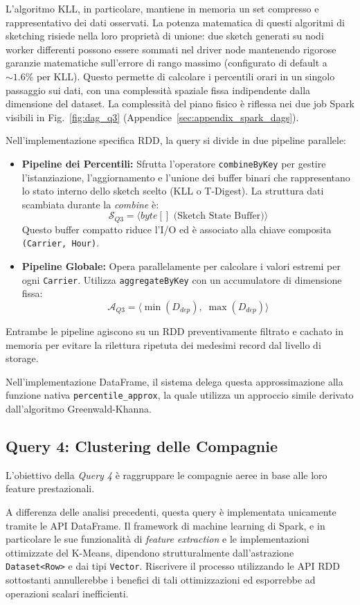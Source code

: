 \documentclass[conference]{IEEEtran}
\begin{document}
L'algoritmo KLL, in particolare, mantiene in memoria un set compresso e rappresentativo dei dati osservati.
La potenza matematica di questi algoritmi di sketching risiede nella loro proprietà di unione: due sketch generati su nodi worker differenti possono essere sommati nel driver node mantenendo rigorose garanzie matematiche sull'errore di rango massimo (configurato di default a $\sim 1.6\%$ per KLL).
Questo permette di calcolare i percentili orari in un singolo passaggio sui dati, con una complessità spaziale fissa indipendente dalla dimensione del dataset.
La complessità del piano fisico è riflessa nei due job Spark visibili in Fig.~\ref{fig:dag_q3} (Appendice~\ref{sec:appendix_spark_dags}).

Nell'implementazione specifica RDD, la query si divide in due pipeline parallele:
\begin{itemize}
    \item \textbf{Pipeline dei Percentili:} Sfrutta l'operatore \texttt{combineByKey} per gestire l'istanziazione, l'aggiornamento e l'unione dei buffer binari che rappresentano lo stato interno dello sketch scelto (KLL o T-Digest). La struttura dati scambiata durante la \textit{combine} è:
    \[
    \mathcal{S}_{Q3} = \langle byte[] \text{ (Sketch State Buffer)} \rangle
    \]
    Questo buffer compatto riduce l'I/O ed è associato alla chiave composita \texttt{(Carrier, Hour)}.
    \item \textbf{Pipeline Globale:} Opera parallelamente per calcolare i valori estremi per ogni \texttt{Carrier}. Utilizza \texttt{aggregateByKey} con un accumulatore di dimensione fissa:
    \[
    \mathcal{A}_{Q3} = \langle \min(D_{dep}),\; \max(D_{dep}) \rangle
    \]
\end{itemize}
Entrambe le pipeline agiscono su un RDD preventivamente filtrato e cachato in memoria per evitare la rilettura ripetuta dei medesimi record dal livello di storage.

Nell'implementazione DataFrame, il sistema delega questa approssimazione alla funzione nativa \texttt{percentile\_approx}, la quale utilizza un approccio simile derivato dall'algoritmo Greenwald-Khanna.

\subsection{Query 4: Clustering delle Compagnie}
L'obiettivo della \textit{Query 4} è raggruppare le compagnie aeree in base alle loro feature prestazionali.

A differenza delle analisi precedenti, questa query è implementata unicamente tramite le API DataFrame.
Il framework di machine learning di Spark, e in particolare le sue funzionalità di \textit{feature extraction} e le implementazioni ottimizzate del K-Means, dipendono strutturalmente dall'astrazione \texttt{Dataset<Row>} e dai tipi \texttt{Vector}.
Riscrivere il processo utilizzando le API RDD sottostanti annullerebbe i benefici di tali ottimizzazioni ed esporrebbe ad operazioni scalari inefficienti.
\end{document}
